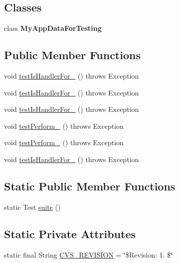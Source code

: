 \subsection*{Classes}
\begin{DoxyCompactItemize}
\item 
class {\bfseries My\-App\-Data\-For\-Testing}
\end{DoxyCompactItemize}
\subsection*{Public Member Functions}
\begin{DoxyCompactItemize}
\item 
void \hyperlink{classorg_1_1jgap_1_1impl_1_1_default_compare_to_handler_test_ac0b0be2771123f3d9b86f18b87c44991}{test\-Is\-Handler\-For\-\_} ()  throws Exception 
\item 
void \hyperlink{classorg_1_1jgap_1_1impl_1_1_default_compare_to_handler_test_a05957c5862031734add86747193ee1c1}{test\-Is\-Handler\-For\-\_} ()  throws Exception 
\item 
void \hyperlink{classorg_1_1jgap_1_1impl_1_1_default_compare_to_handler_test_accb19b527b5a9cd40e1f1878a025a507}{test\-Is\-Handler\-For\-\_} ()  throws Exception 
\item 
void \hyperlink{classorg_1_1jgap_1_1impl_1_1_default_compare_to_handler_test_af380284014d09da8a5c010c6d4051fc0}{test\-Perform\-\_} ()  throws Exception 
\item 
void \hyperlink{classorg_1_1jgap_1_1impl_1_1_default_compare_to_handler_test_a6cd65babd1df12aa868620d47e00b440}{test\-Perform\-\_} ()  throws Exception 
\item 
void \hyperlink{classorg_1_1jgap_1_1impl_1_1_default_compare_to_handler_test_acce9aac9d4fa77f19a42e9de1449a9c2}{test\-Is\-Handler\-For\-\_} ()  throws Exception 
\end{DoxyCompactItemize}
\subsection*{Static Public Member Functions}
\begin{DoxyCompactItemize}
\item 
static Test \hyperlink{classorg_1_1jgap_1_1impl_1_1_default_compare_to_handler_test_ab2dfac85140443d60e55a65caa757d55}{suite} ()
\end{DoxyCompactItemize}
\subsection*{Static Private Attributes}
\begin{DoxyCompactItemize}
\item 
static final String \hyperlink{classorg_1_1jgap_1_1impl_1_1_default_compare_to_handler_test_ad73b764cc0b05011eea331a92af4de88}{C\-V\-S\-\_\-\-R\-E\-V\-I\-S\-I\-O\-N} = \char`\"{}\$Revision\-: 1. \$\char`\"{}
\end{DoxyCompactItemize}
